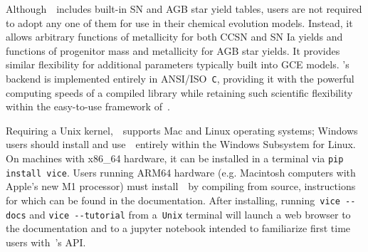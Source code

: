 \documentclass[ms.tex]{subfiles}
\begin{document}
Although~\vice~includes built-in SN and AGB star yield tables, users are not
required to adopt any one of them for use in their chemical evolution models.
Instead, it allows arbitrary functions of metallicity for both CCSN and SN Ia
yields and functions of progenitor mass and metallicity for AGB star yields.
It provides similar flexibility for additional parameters typically built into
GCE models.
\vice's backend is implemented entirely in ANSI/ISO~\texttt{C}, providing it
with the powerful computing speeds of a compiled library while retaining such
scientific flexibility within the easy-to-use framework of~\python.
\par
Requiring a Unix kernel,~\vice~supports Mac and Linux operating systems;
Windows users should install and use~\vice~entirely within the Windows
Subsystem for Linux.
On machines with x86\_64 hardware, it can be installed in a terminal via
\texttt{pip install vice}.
Users running ARM64 hardware (e.g. Macintosh computers with Apple's new M1
processor) must install~\vice~by compiling from source,
instructions for which can be found in the documentation.
After installing, running~\texttt{vice -{}-docs} and
\texttt{vice -{}-tutorial} from a~\texttt{Unix} terminal will launch a web
browser to the documentation and to a jupyter notebook intended to familiarize
first time users with~\vice's API.
\end{document}
